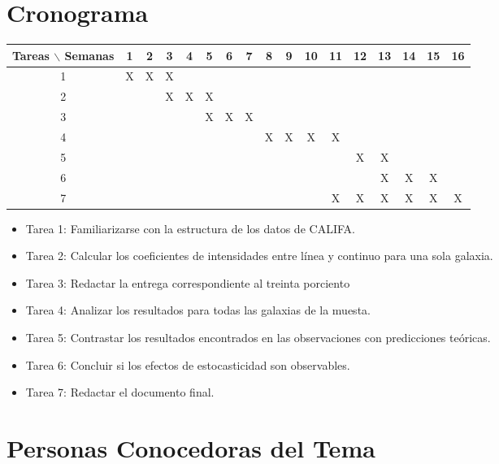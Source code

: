 \documentclass[12pt]{article}
\begin{document}
\section{Cronograma}

\begin{table}[htb]
	\begin{tabular}{|c|cccccccccccccccc| }
	\hline
	Tareas $\backslash$ Semanas & 1 & 2 & 3 & 4 & 5 & 6 & 7 & 8 & 9 & 10 & 11 & 12 & 13 & 14 & 15 & 16  \\
	\hline
	1 & X & X & X &   &   &   &   &   &   &   &   &   &   &   &   &   \\
	2 &   &   & X & X & X &   &   &   &   &   &   &   &   &   &   &   \\
	3 &   &   &   &   & X & X & X &   &   &   &   &   &   &   &   &   \\
	4 &   &   &   &   &   &   &   & X & X & X & X &   &   &   &   &   \\
	5 &   &   &   &   &   &   &   &   &   &   &   & X & X &   &   &   \\
	6 &   &   &   &   &   &   &   &   &   &   &   &   & X & X & X &   \\
	7 &   &   &   &   &   &   &   &   &   &   & X & X & X & X & X & X \\
	\hline
	\end{tabular}
\end{table}
\vspace{1mm}

\begin{itemize}
    \item Tarea 1: Familiarizarse con la estructura de los datos de
      CALIFA. 
    \item Tarea 2: Calcular los coeficientes de intensidades entre
      l\'inea y continuo para una sola galaxia.
    \item Tarea 3: Redactar la entrega correspondiente al treinta
      porciento
    \item Tarea 4: Analizar los resultados para todas las galaxias de
      la muesta. 
    \item Tarea 5: Contrastar los resultados encontrados en las
      observaciones con predicciones te\'oricas.
    \item Tarea 6: Concluir si los efectos de estocasticidad son observables. 
    \item Tarea 7: Redactar el documento final.
\end{itemize}

\section{Personas Conocedoras del Tema}
\end{document}
